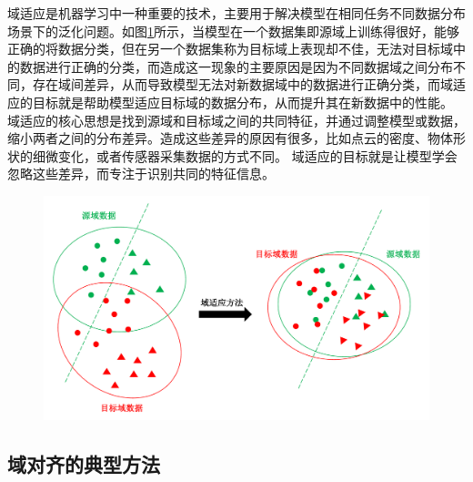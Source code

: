 域适应是机器学习中一种重要的技术，主要用于解决模型在相同任务不同数据分布场景下的泛化问题。如图\ref{fig:2-3}所示，当模型在一个数据集即源域上训练得很好，能够正确的将数据分类，但在另一个数据集称为目标域上表现却不佳，无法对目标域中的数据进行正确的分类，而造成这一现象的主要原因是因为不同数据域之间分布不同，存在域间差异，从而导致模型无法对新数据域中的数据进行正确分类，而域适应的目标就是帮助模型适应目标域的数据分布，从而提升其在新数据中的性能。
域适应的核心思想是找到源域和目标域之间的共同特征，并通过调整模型或数据，缩小两者之间的分布差异。造成这些差异的原因有很多，比如点云的密度、物体形状的细微变化，或者传感器采集数据的方式不同。
域适应的目标就是让模型学会忽略这些差异，而专注于识别共同的特征信息。
\begin{figure}[h]
    \centering
    \includegraphics[width = \textwidth, scale=0.5]{ljx/figure/2-3DA.pdf}
    \label{fig:2-3}
    \vspace{-0.35cm} 
\end{figure}
\subsection{域对齐的典型方法}
